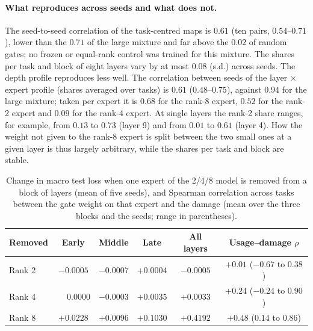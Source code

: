 \documentclass[11pt]{article}
\begin{document}
\paragraph{What reproduces across seeds and what does not.} The seed-to-seed correlation of the
task-centred maps is $0.61$ (ten pairs, $0.54$--$0.71$), lower than the $0.71$ of the large
mixture and far above the $0.02$ of random gates; no frozen or equal-rank control was trained
for this mixture. The shares per task and block of eight layers vary by at most $0.08$ (s.d.)
across seeds. The depth profile reproduces less well. The correlation between seeds of the
layer $\times$ expert profile (shares averaged over tasks) is $0.61$ ($0.48$--$0.75$), against
$0.94$ for the large mixture; taken per expert it is $0.68$ for the rank-8 expert, $0.52$ for
the rank-2 expert and $0.09$ for the rank-4 expert. At single layers the rank-2 share ranges,
for example, from $0.13$ to $0.73$ (layer 9) and from $0.01$ to $0.61$ (layer 4). How the
weight not given to the rank-8 expert is split between the two small ones at a given layer is
thus largely arbitrary, while the shares per task and block are stable.

\begin{table}[t]
\centering
\caption{Change in macro test loss when one expert of the 2/4/8 model is removed from a block of
layers (mean of five seeds), and Spearman correlation across tasks between the gate weight on
that expert and the damage (mean over the three blocks and the seeds; range in parentheses).}
\label{tab:kosmall}
\small
\begin{tabular}{lccccc}
\toprule
Removed & Early & Middle & Late & All layers & Usage--damage $\rho$ \\
\midrule
Rank 2 & $-0.0005$ & $-0.0007$ & $+0.0004$ & $-0.0005$ & $+0.01$ ($-0.67$ to $0.38$) \\
Rank 4 & $\phantom{-}0.0000$ & $-0.0003$ & $+0.0035$ & $+0.0033$ & $+0.24$ ($-0.24$ to $0.90$) \\
Rank 8 & $+0.0228$ & $+0.0096$ & $+0.1030$ & $+0.4192$ & $+0.48$ ($0.14$ to $0.86$) \\
\bottomrule
\end{tabular}
\end{table}
\end{document}
